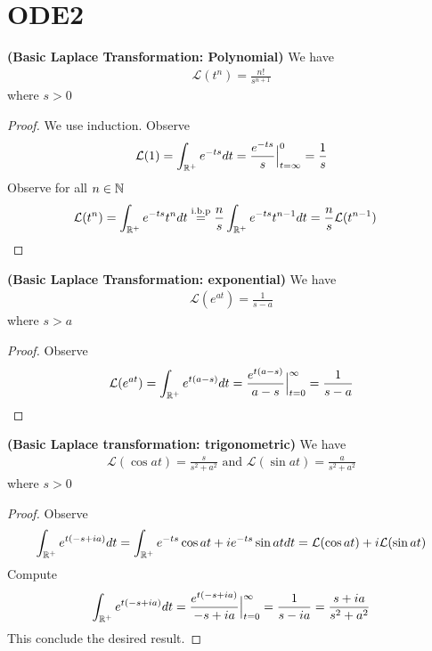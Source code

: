 \documentclass{report}
\begin{document}
\section{ODE2}
\begin{theorem}
\textbf{(Basic Laplace Transformation: Polynomial)} We have 
\begin{align*}
\mathcal{L}(t^n)= \frac{n!}{s^{n+1}}
\end{align*}
where $s>0$
\end{theorem}
\begin{proof}
We use induction. Observe 
\begin{align*}
\mathcal{L}(1)=\int_{\mathbb{R}^+} e^{-ts}dt= \frac{e^{-ts}}{s}\Big|_{t=\infty}^{0}=\frac{1}{s}
\end{align*}
Observe for all $n\in\mathbb{N}$
\begin{align*}
\mathcal{L}(t^n)&= \int_{\mathbb{R}^+} e^{-ts}t^ndt\overset{\text{i.b.p}}= \frac{n}{s}\int_{\mathbb{R}^+}e^{-ts}t^{n-1}dt=\frac{n}{s}\mathcal{L}(t^{n-1})
\end{align*}
\end{proof}
\begin{theorem}
\textbf{(Basic Laplace Transformation: exponential)} We have 
\begin{align*}
\mathcal{L}(e^{at})= \frac{1}{s-a}
\end{align*}
where $s>a$
\end{theorem}
\begin{proof}
Observe 
\begin{align*}
\mathcal{L}(e^{at})=\int_{\mathbb{R}^+}e^{t(a-s)}dt= \frac{e^{t(a-s)}}{a-s}\Big|_{t=0}^{\infty}= \frac{1}{s-a}
\end{align*}
\end{proof}
\begin{theorem}
\textbf{(Basic Laplace transformation: trigonometric)} We have 
\begin{align*}
\mathcal{L}(\cos at)= \frac{s}{s^2+a^2} \text{ and }\mathcal{L}(\sin at)= \frac{a}{s^2+a^2}
\end{align*}
where $s>0$
\end{theorem}
\begin{proof}
Observe 
\begin{align*}
\int_{\mathbb{R}^+} e^{t(-s+ia)}dt= \int_{\mathbb{R}^+} e^{-ts}\cos at+ ie^{-ts}\sin at dt= \mathcal{L}(\cos at)+  i \mathcal{L}(\sin at)
\end{align*}
Compute 
\begin{align*}
\int_{\mathbb{R}^+}e^{t(-s+ia)}dt= \frac{e^{t(-s+ia)}}{-s+ia}\Big|_{t=0}^{\infty}= \frac{1}{s-ia}= \frac{s+ia}{s^2+a^2}
\end{align*}
This conclude the desired result.
\end{proof}
\end{document}
